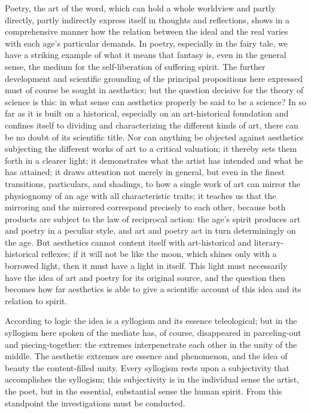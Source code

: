 \documentclass[12pt]{book}
\begin{document}
Poetry, the art of the word, which can hold a whole worldview and partly directly, partly
indirectly express itself in thoughts and reflections, shows in a comprehensive manner how the
relation between the ideal and the real varies with each age's particular demands. In poetry,
especially in the fairy tale, we have a striking example of what it means that fantasy is, even
in the general sense, the medium for the self-liberation of suffering spirit. The further
development and scientific grounding of the principal propositions here expressed must of course
be sought in aesthetics; but the question decisive for the theory of science is this: in what
sense can aesthetics properly be said to be a science? In so far as it is built on a historical,
especially on an art-historical foundation and confines itself to dividing and characterizing
the different kinds of art, there can be no doubt of its scientific title. Nor can anything be
objected against aesthetics subjecting the different works of art to a critical valuation; it
thereby sets them forth in a clearer light; it demonstrates what the artist has intended and what
he has attained; it draws attention not merely in general, but even in the finest transitions,
particulars, and shadings, to how a single work of art can mirror the physiognomy of an age with
all characteristic traits; it teaches us that the mirroring and the mirrored correspond precisely
to each other, because both products are subject to the law of reciprocal action: the age's
spirit produces art and poetry in a peculiar style, and art and poetry act in turn determiningly
on the age. But aesthetics cannot content itself with art-historical and literary-historical
reflexes; if it will not be like the moon, which shines only with a borrowed light, then it must
have a light in itself. This light must necessarily have the idea of art and poetry for its
original source, and the question then becomes how far aesthetics is able to give a scientific
account of this idea and its relation to spirit.

According to logic the idea is a syllogism and its essence teleological; but in the syllogism here
spoken of the mediate has, of course, disappeared in parceling-out and piecing-together: the
extremes interpenetrate each other in the unity of the middle. The aesthetic extremes are essence
and phenomenon, and the idea of beauty the content-filled unity. Every syllogism rests upon a
subjectivity that accomplishes the syllogism; this subjectivity is in the individual sense the
artist, the poet, but in the essential, substantial sense the human spirit. From this standpoint
the investigations must be conducted.
\end{document}
